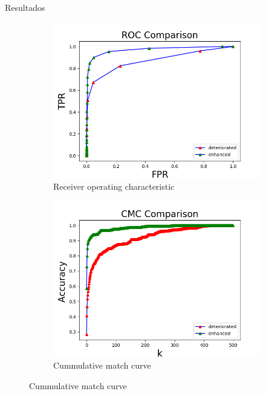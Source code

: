 \documentclass[12pt,aspectratio=169]{beamer}
\begin{document}
\begin{frame}{Resultados}

    \begin{figure}
        \begin{subfigure}{0.48\textwidth}
            \centering
            \includegraphics[scale=0.45]{figs/roc_comparison.png}
            \caption{Receiver operating characteristic}
        \end{subfigure}
        \begin{subfigure}{0.48\textwidth}
            \centering
            \includegraphics[scale=0.45]{figs/cmc_comparison.png}
            \caption{Cummulative match curve}
        \end{subfigure}
    \end{figure}

\end{frame}
\end{document}
